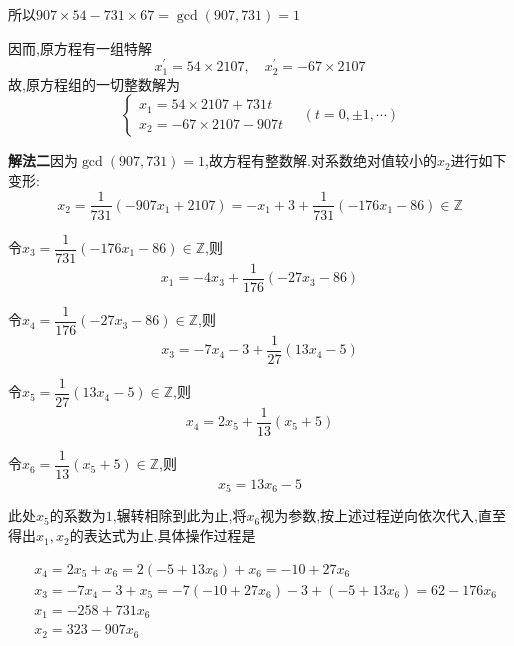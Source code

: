 所以$907 \times 54-731 \times 67=\operatorname{gcd}(907,731)=1$

因而,原方程有一组特解
\begin{equation*}
	x_{1}^{\prime}=54 \times 2107, \quad x_{2}^{\prime}=-67 \times 2107
\end{equation*}
故,原方程组的一切整数解为
\begin{equation*}
	\begin{cases}
		x_{1}=54 \times 2107+731 t \\
		x_{2}=-67 \times 2107-907 t
	\end{cases} \quad(t=0, \pm 1, \cdots)
\end{equation*}

\textbf{解法二}因为$\operatorname{gcd}(907,731)=1$,故方程有整数解.对系数绝对值较小的$x_{2}$进行如下变形:
\begin{equation*}
	x_{2}=\frac{1}{731}\left(-907 x_{1}+2107\right)=-x_{1}+3+\frac{1}{731}\left(-176 x_{1}-86\right) \in \mathbb{Z}
\end{equation*}

令$x_{3}=\dfrac{1}{731}\left(-176 x_{1}-86\right) \in \mathbb{Z}$,则
\begin{equation*}
	x_{1}=-4 x_{3}+\frac{1}{176}\left(-27 x_{3}-86\right)
\end{equation*}

令$x_{4}=\dfrac{1}{176}\left(-27 x_{3}-86\right) \in \mathbb{Z}$,则
\begin{equation*}
	x_{3}=-7 x_{4}-3+\frac{1}{27}\left(13 x_{4}-5\right)
\end{equation*}

令$x_{5}=\dfrac{1}{27}\left(13 x_{4}-5\right) \in \mathbb{Z}$,则
\begin{equation*}
	x_{4}=2 x_{5}+\frac{1}{13}\left(x_{5}+5\right)
\end{equation*}

令$x_{6}=\dfrac{1}{13}\left(x_{5}+5\right) \in \mathbb{Z}$,则
\begin{equation*}
	x_{5}=13 x_{6}-5
\end{equation*}

此处$x_{5}$的系数为$1$,辗转相除到此为止,将$x_{6}$视为参数,按上述过程逆向依次代入,直至得出$x_{1}, x_{2}$的表达式为止.具体操作过程是

\begin{equation*}
	\begin{aligned}
		&x_{4}=2 x_{5}+x_{6}=2\left(-5+13 x_{6}\right)+x_{6}=-10+27 x_{6} \\
		&x_{3}=-7 x_{4}-3+x_{5}=-7\left(-10+27 x_{6}\right)-3+\left(-5+13 x_{6}\right)=62-176 x_{6} \\
		&x_{1}=-258+731 x_{6} \\
		&x_{2}=323-907 x_{6}
	\end{aligned}
\end{equation*}

